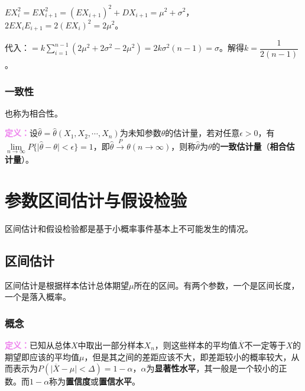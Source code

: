 \documentclass[UTF8, 12pt]{ctexart}
\begin{document}
$EX_i^2=EX_{i+1}^2=(EX_{i+1})^2+DX_{i+1}=\mu^2+\sigma^2$，$2EX_iE_{i+1}=2(EX_i)^2=2\mu^2$。

代入：$=k\sum\limits_{i=1}^{n-1}(2\mu^2+2\sigma^2-2\mu^2)=2k\sigma^2(n-1)=\sigma$。解得$k=\dfrac{1}{2(n-1)}$。

\subsubsection{一致性}

也称为相合性。

\textcolor{violet}{\textbf{定义：}}设$\hat{\theta}=\hat{\theta}(X_1,X_2,\cdots,X_n)$为未知参数$\theta$的估计量，若对任意$\epsilon>0$，有$\lim\limits_{n\to\infty}P\{\vert\hat{\theta}-\theta\vert<\epsilon\}=1$，即$\hat{\theta}\overset{P}{\longrightarrow}\theta(n\to\infty)$，则称$\hat{\theta}$为$\theta$的\textbf{一致估计量}（\textbf{相合估计量}）。

\section{参数区间估计与假设检验}



区间估计和假设检验都是基于小概率事件基本上不可能发生的情况。

\subsection{区间估计}

区间估计是根据样本估计总体期望$\mu$所在的区间。有两个参数，一个是区间长度，一个是落入概率。

\subsubsection{概念}

\textcolor{violet}{\textbf{定义：}}已知从总体$X$中取出一部分样本$X_n$，则这些样本的平均值$\overline{X}$不一定等于$X$的期望即应该的平均值$\mu$，但是其之间的差距应该不大，即差距较小的概率较大，从而表示为$P(\vert\overline{X}-\mu\vert<\Delta)=1-\alpha$，$\alpha$为\textbf{显著性水平}，其一般是一个较小的正数。而$1-\alpha$称为\textbf{置信度}或\textbf{置信水平}。
\end{document}
